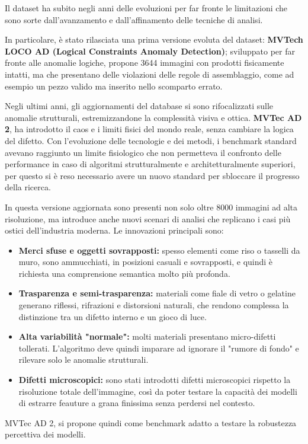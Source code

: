 Il dataset ha subito negli anni delle evoluzioni per far fronte le limitazioni che sono sorte dall'avanzamento e dall'affinamento delle tecniche di analisi.

In particolare, è stato rilasciata una prima versione evoluta del dataset: \textbf{MVTech LOCO AD (Logical Constraints Anomaly Detection)}; sviluppato per far fronte alle anomalie logiche, propone 3644 immagini con prodotti fisicamente intatti, ma che presentano delle violazioni delle regole di assemblaggio, come ad esempio un pezzo valido ma inserito nello scomparto errato.\cite{MVTech_LOCO_AD}

Negli ultimi anni, gli aggiornamenti del database si sono rifocalizzati sulle anomalie strutturali, estremizzandone la complessità visiva e ottica.
\textbf{MVTec AD 2}, ha introdotto il caos e i limiti fisici del mondo reale, senza cambiare la logica del difetto. Con l'evoluzione delle tecnologie e dei metodi, i benchmark standard avevano raggiunto un limite fisiologico che non permetteva il confronto delle performance in caso di algoritmi strutturalmente e architetturalmente superiori, per questo si è reso necessario avere un nuovo standard per sbloccare il progresso della ricerca.

In questa versione aggiornata sono presenti non solo oltre 8000 immagini ad alta risoluzione, ma introduce anche nuovi scenari di analisi che replicano i casi più ostici dell'industria moderna. Le innovazioni principali sono:
\begin{itemize}
    \item\textbf{Merci sfuse e oggetti sovrapposti:} spesso elementi come riso o tasselli da muro, sono ammucchiati, in posizioni casuali e sovrapposti, e quindi è richiesta una comprensione semantica molto più profonda.
    \item \textbf{Trasparenza e semi-trasparenza:} materiali come fiale di vetro o gelatine generano riflessi, rifrazioni e distorsioni naturali, che rendono complessa la distinzione tra un difetto interno e un gioco di luce.
    \item \textbf{Alta variabilità "normale":} molti materiali presentano micro-difetti tollerati. L'algoritmo deve quindi imparare ad ignorare il "rumore di fondo" e rilevare solo le anomalie strutturali.
    \item \textbf{Difetti microscopici:} sono stati introdotti difetti microscopici rispetto la risoluzione totale dell'immagine, così da poter testare la capacità dei modelli di estrarre feauture a grana finissima senza perdersi nel contesto.
\end{itemize}
MVTec AD 2, si propone quindi come benchmark adatto a testare la robustezza percettiva dei modelli. \cite{Steger_et_al._2025}


